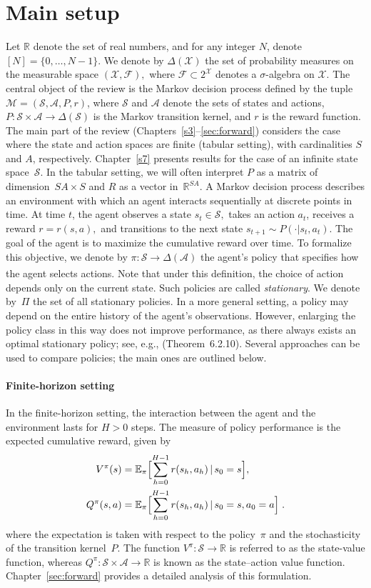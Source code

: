\documentclass{article}
\numberwithin{equation}{section}
\newcommand{\R}{\mathbb{R}}
\newcommand{\cA}{\mathcal{A}}
\newcommand{\cM}{\mathcal{M}}
\newcommand{\cF}{\mathcal{F}}
\newcommand{\cS}{\mathcal{S}}
\newcommand{\cX}{\mathcal{X}}
\newcommand{\eqsp}{\;}
\begin{document}
\section{Main setup}
\label{s2}

Let $\R$ denote the set of real numbers, and for any integer $N$, denote $[N] = \{0,\dots,N-1\}$.  We  denote by $\Delta(\cX)$ the set of probability measures on the measurable space $(\cX,\cF),$ where $\cF\subset 2^{\cX}$ denotes a $\sigma$-algebra on $\cX$. The central object of the review is the Markov decision process defined by the tuple $\cM=(\cS,\cA,P, r)$, where $\cS$ and $\cA$ denote the sets of states and actions, $P: \cS\times\cA \rightarrow \Delta(\cS)$ is the Markov transition kernel, and \(r\) is the reward function. The main part of the review (Chapters~\ref{s3}--\ref{sec:forward}) considers the case where the state and action spaces are finite (tabular setting), with cardinalities $S$ and $A$, respectively. Chapter~\ref{s7} presents results for the case of an infinite state space~$\mathcal{S}$. In the tabular setting, we will often interpret $P$ as a matrix of dimension~$SA \times S$ and $R$ as a vector in~$\mathbb{R}^{SA}$.
 A Markov decision process describes an environment with which an agent interacts sequentially at discrete points in time. At time $t$, the agent observes a state $s_t\in \cS,$ takes an action $a_t$, receives a reward $r=r(s,a),$ and  transitions to the next state $s_{t+1} \sim P(\cdot|s_t,a_t)$. The goal of the agent is to maximize the cumulative reward over time. To formalize this objective, we denote by $\pi : \cS\xrightarrow[]{}\Delta(\cA)$ the agent's policy that specifies how the agent selects actions. Note that under this definition, the choice of action depends only on the current state. Such policies are called \emph{stationary}. We denote by~$\Pi$ the set of all stationary policies. In a more general setting, a policy may depend on the entire history of the agent's observations. 
However, enlarging the policy class in this way does not improve performance, as there always exists an optimal stationary policy; see, e.g., \cite{putermanMDP} (Theorem~6.2.10). Several approaches can be used to compare policies; the main ones are outlined below.
\paragraph{Finite-horizon setting}
In the finite-horizon setting, the interaction between the agent and the environment lasts for $H > 0$ steps. The measure of policy performance is the expected cumulative reward, given by
\begin{align}
    V^{\pi}(s) &= \mathbb{E}_\pi \Bigl[\sum_{h=0}^{H-1}r(s_h,a_h) \, |\, s_0 = s \Bigr], \\
    Q^{\pi}(s, a) &= \mathbb{E}_\pi \Bigl[\sum_{h=0}^{H-1}r(s_h,a_h) \, |\, s_0 = s, a_0=a \Bigr]\eqsp.
\end{align}
where the expectation is taken with respect to the policy~$\pi$ and the stochasticity of the transition kernel~$P$. The function $V^\pi : \cS\rightarrow\mathbb{R}$ is referred to as the state-value function, whereas $Q^\pi : \cS\times\cA\rightarrow\mathbb{R}$ is known as the state–action value function. Chapter~\ref{sec:forward} provides a detailed analysis of this formulation.
\end{document}

